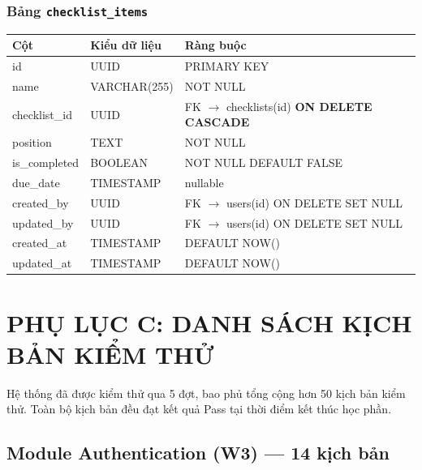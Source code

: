 \subsubsection*{Bảng \texttt{checklist\_items}}
\begin{table}[H]
\centering
\begin{tabularx}{\textwidth}{|l|l|X|}
\hline
\rowcolor{gray!20}
\textbf{Cột} & \textbf{Kiểu dữ liệu} & \textbf{Ràng buộc} \\
\hline
id & UUID & PRIMARY KEY \\
\hline
name & VARCHAR(255) & NOT NULL \\
\hline
checklist\_id & UUID & FK $\rightarrow$ checklists(id) \textbf{ON DELETE CASCADE} \\
\hline
position & TEXT & NOT NULL \\
\hline
is\_completed & BOOLEAN & NOT NULL DEFAULT FALSE \\
\hline
due\_date & TIMESTAMP & nullable \\
\hline
created\_by & UUID & FK $\rightarrow$ users(id) ON DELETE SET NULL \\
\hline
updated\_by & UUID & FK $\rightarrow$ users(id) ON DELETE SET NULL \\
\hline
created\_at & TIMESTAMP & DEFAULT NOW() \\
\hline
updated\_at & TIMESTAMP & DEFAULT NOW() \\
\hline
\end{tabularx}
\end{table}

\clearpage

\section{PHỤ LỤC C: DANH SÁCH KỊCH BẢN KIỂM THỬ}
\label{appendix:testcases}

Hệ thống đã được kiểm thử qua 5 đợt, bao phủ tổng cộng hơn 50 kịch bản kiểm thử. Toàn bộ kịch bản đều đạt kết quả Pass tại thời điểm kết thúc học phần.

\subsection*{Module Authentication (W3) — 14 kịch bản}

